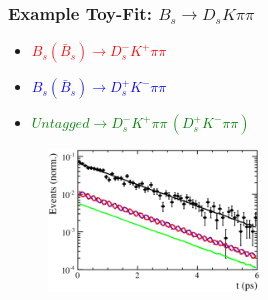 \documentclass{beamer}
\begin{document}
\begin{frame}
	\frametitle{Example Toy-Fit: $B_s \to D_s K \pi \pi$}

	\centering
	
	\begin{block}{}
	\begin{itemize}
		\item  \textcolor{red}{$B_s (\bar B_s) \to D_s^- K^+ \pi \pi$}
		 \item  \textcolor{blue}{$B_s (\bar B_s) \to D_s^+ K^- \pi \pi$}
		\item  \textcolor{green}{$Untagged \to D_s^- K^+ \pi \pi \, (D_s^+ K^- \pi \pi)$}

	\end{itemize}
	\end{block}	
	
	\begin{figure}[hp]
	\centering
		\includegraphics[width=0.5\textwidth, height = !]{plots_toy/h_t_2_log.eps} 		
	\end{figure}				
\end{frame}
\end{document}
